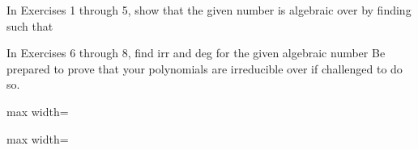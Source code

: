 \documentclass[11pt,oneside]{article}
\begin{document}
\BookNarrativefalse

\begin{BookBody}



\noindent In Exercises 1 through 5, show that the given number  is algebraic over  by finding  such that 






\noindent In Exercises 6 through 8, find irr and deg for the given algebraic number  Be prepared to prove that your polynomials are irreducible over  if challenged to do so.


\begin{center}\begin{adjustbox}{max width=\linewidth}\end{adjustbox}\end{center}

\begin{center}\begin{adjustbox}{max width=\linewidth}\end{adjustbox}\end{center}


\end{BookBody}

\BookNarrativefalse
\end{document}
